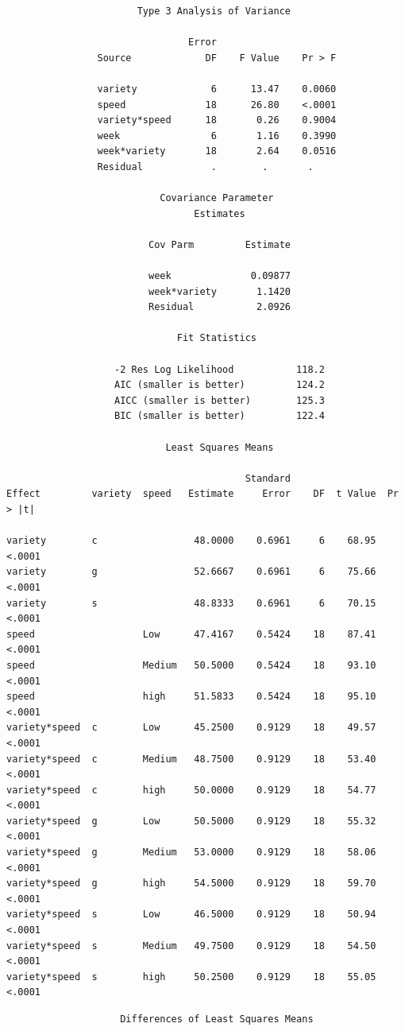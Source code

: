 \begin{small}
\begin{verbatim}
                       Type 3 Analysis of Variance
 
                                Error
                Source             DF    F Value    Pr > F

                variety             6      13.47    0.0060
                speed              18      26.80    <.0001
                variety*speed      18       0.26    0.9004
                week                6       1.16    0.3990
                week*variety       18       2.64    0.0516
                Residual            .        .       .    

                           Covariance Parameter
                                 Estimates
 
                         Cov Parm         Estimate

                         week              0.09877
                         week*variety       1.1420
                         Residual           2.0926

                              Fit Statistics

                   -2 Res Log Likelihood           118.2
                   AIC (smaller is better)         124.2
                   AICC (smaller is better)        125.3
                   BIC (smaller is better)         122.4

                            Least Squares Means
 
                                          Standard
Effect         variety  speed   Estimate     Error    DF  t Value  Pr > |t|

variety        c                 48.0000    0.6961     6    68.95    <.0001
variety        g                 52.6667    0.6961     6    75.66    <.0001
variety        s                 48.8333    0.6961     6    70.15    <.0001
speed                   Low      47.4167    0.5424    18    87.41    <.0001
speed                   Medium   50.5000    0.5424    18    93.10    <.0001
speed                   high     51.5833    0.5424    18    95.10    <.0001
variety*speed  c        Low      45.2500    0.9129    18    49.57    <.0001
variety*speed  c        Medium   48.7500    0.9129    18    53.40    <.0001
variety*speed  c        high     50.0000    0.9129    18    54.77    <.0001
variety*speed  g        Low      50.5000    0.9129    18    55.32    <.0001
variety*speed  g        Medium   53.0000    0.9129    18    58.06    <.0001
variety*speed  g        high     54.5000    0.9129    18    59.70    <.0001
variety*speed  s        Low      46.5000    0.9129    18    50.94    <.0001
variety*speed  s        Medium   49.7500    0.9129    18    54.50    <.0001
variety*speed  s        high     50.2500    0.9129    18    55.05    <.0001
\end{verbatim}
\newpage
\begin{verbatim}
                    Differences of Least Squares Means
 

\end{verbatim}
\end{small}
